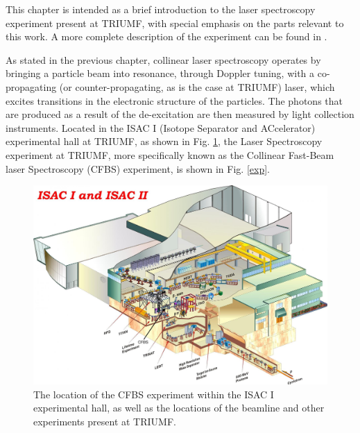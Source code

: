 \noindent This chapter is intended as a brief introduction to the laser spectroscopy experiment present at TRIUMF, with special emphasis on the parts relevant to this work. A more complete description of the experiment can be found in \cite{CFBS}.

As stated in the previous chapter, collinear laser spectroscopy operates by bringing a particle beam into resonance, through Doppler tuning, with a co-propagating (or counter-propagating, as is the case at TRIUMF) laser, which excites transitions in the electronic structure of the particles. The photons that are produced as a result of the de-excitation are then measured by light collection instruments. Located in the ISAC I (Isotope Separator and ACcelerator) experimental hall at TRIUMF, as shown in Fig. \ref{loc}, the Laser Spectroscopy experiment at TRIUMF, more specifically known as the Collinear Fast-Beam laser Spectroscopy (CFBS) experiment, is shown in Fig. \ref{exp}. 


\begin{figure}[h]
\includegraphics[width=\textwidth]{Laser_spec_triumf/ISAC.png}
\caption[The location of the CFBS experiment]{\small The location of the CFBS experiment within the ISAC I experimental hall, as well as the locations of the beamline and other experiments present at TRIUMF\cite{CFBS}.}
\label{loc}
\end{figure}

